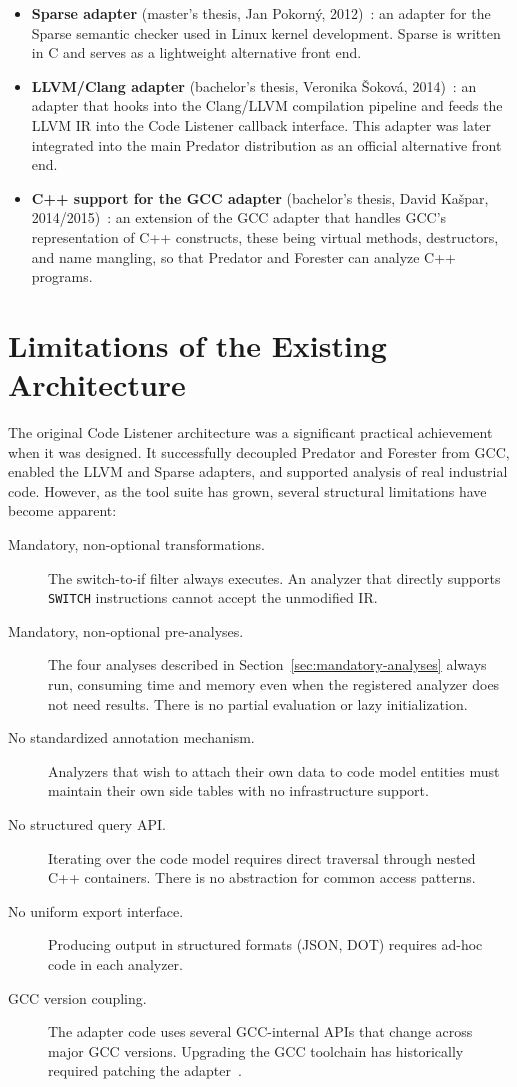 \begin{itemize}
  \item \textbf{Sparse adapter} (master's thesis, Jan Pokorný, 2012)~\cite{SparseAdapter2012}: an adapter for the Sparse semantic checker used in Linux kernel development. Sparse is written in C and serves as a lightweight alternative front end.
  \item \textbf{LLVM/Clang adapter} (bachelor's thesis, Veronika Šoková, 2014)~\cite{LLVMAdapter2014}: an adapter that hooks into the Clang/LLVM compilation pipeline and feeds the LLVM IR into the Code Listener callback interface. This adapter was later integrated into the main Predator distribution as an official alternative front end.
  \item \textbf{C++ support for the GCC adapter} (bachelor's thesis, David Kašpar, 2014/2015)~\cite{CppExtension2014}: an extension of the GCC adapter that handles GCC's representation of C++ constructs, these being virtual methods, destructors, and name mangling, so that Predator and Forester can analyze C++ programs.
\end{itemize}

\section{Limitations of the Existing Architecture}
\label{sec:limitations}

The original Code Listener architecture was a significant practical achievement when it was designed. It successfully decoupled Predator and Forester from GCC, enabled the LLVM and Sparse adapters, and supported analysis of real industrial code. However, as the tool suite has grown, several structural limitations have become apparent:

\begin{description}
  \item[Mandatory, non-optional transformations.] The switch-to-if filter always executes. An analyzer that directly supports \texttt{SWITCH} instructions cannot accept the unmodified IR.
  \item[Mandatory, non-optional pre-analyses.] The four analyses described in Section~\ref{sec:mandatory-analyses} always run, consuming time and memory even when the registered analyzer does not need results. There is no partial evaluation or lazy initialization.
  \item[No standardized annotation mechanism.] Analyzers that wish to attach their own data to code model entities must maintain their own side tables with no infrastructure support.
  \item[No structured query API.] Iterating over the code model requires direct traversal through nested C++ containers. There is no abstraction for common access patterns.
  \item[No uniform export interface.] Producing output in structured formats (JSON, DOT) requires ad-hoc code in each analyzer.
  \item[GCC version coupling.] The adapter code uses several GCC-internal APIs that change across major GCC versions. Upgrading the GCC toolchain has historically required patching the adapter~\cite{PredatorHP2020}.
\end{description}

